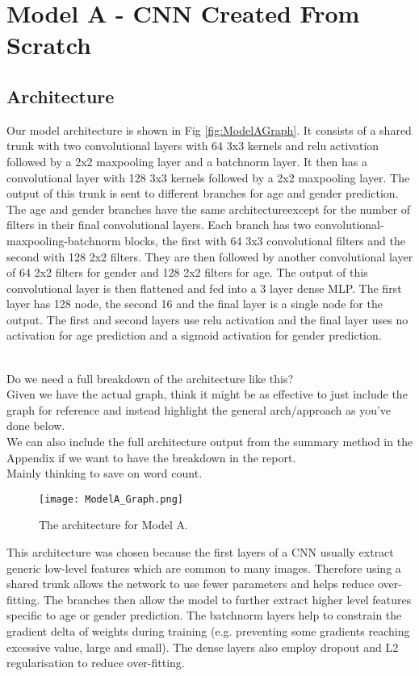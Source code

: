 
\section{Model A - CNN Created From Scratch}
\subsection{Architecture}
Our model architecture is shown in Fig \autoref{fig:ModelAGraph}. 
It consists of a shared trunk with two convolutional layers with 64 3x3 kernels and relu activation followed by a 2x2 maxpooling layer and a batchnorm layer. 
It then has a convolutional layer with 128 3x3 kernels followed by a 2x2 maxpooling layer. 
The output of this trunk is sent to different branches for age and gender prediction. 
The age and gender branches have the same architectureexcept for the number of filters in their final convolutional layers. 
Each branch has two convolutional-maxpooling-batchnorm blocks, the first with 64 3x3 convolutional filters and the second with 128 2x2 filters. 
They are then followed by another convolutional layer of 64 2x2 filters for gender and 128 2x2 filters for age. 
The output of this convolutional layer is then flattened and fed into a 3 layer dense MLP. 
The first layer has 128 node, the second 16 and the final layer is a single node for the output. 
The first and second layers use relu activation and the final layer uses no activation for age prediction and a sigmoid activation for gender prediction.
\begin{notes}
    \\Do we need a full breakdown of the architecture like this?\\
    Given we have the actual graph, think it might be as effective to just include the graph for reference and instead highlight the general arch/approach as you've done below.\\
    We can also include the full architecture output from the summary method in the Appendix if we want to have the breakdown in the report.\\
    Mainly thinking to save on word count.
\end{notes}

\begin{figure}[h!]
    \centering
    \texttt{[image: ModelA\_Graph.png]}
    \caption{\label{fig:ModelAGraph} The architecture for Model A.}
\end{figure}

This architecture was chosen because the first layers of a CNN usually extract generic low-level features which are common to many images. 
Therefore using a shared trunk allows the network to use fewer parameters and helps reduce over-fitting.
The branches then allow the model to further extract higher level features specific to age or gender prediction. 
The batchnorm layers help to constrain the gradient delta of weights during training (e.g. preventing some gradients reaching excessive value, large and small). 
The dense layers also employ dropout and L2 regularisation to reduce over-fitting. 

